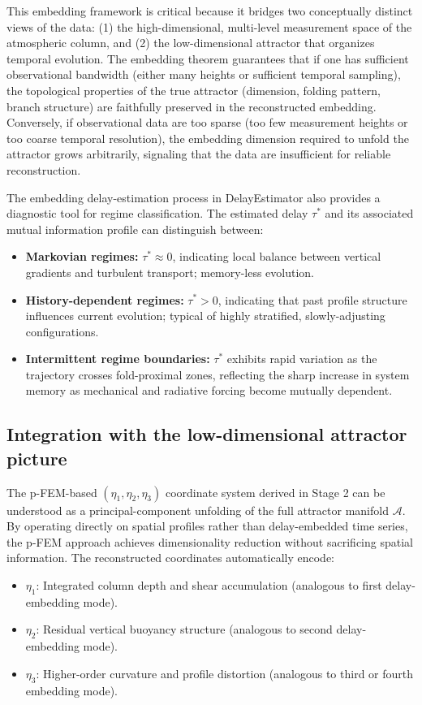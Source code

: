 \documentclass[12pt,a4paper]{article}
\begin{document}
This embedding framework is critical because it bridges two conceptually distinct views of the data: (1) the high-dimensional, multi-level measurement space of the atmospheric column, and (2) the low-dimensional attractor that organizes temporal evolution. The embedding theorem guarantees that if one has sufficient observational bandwidth (either many heights or sufficient temporal sampling), the topological properties of the true attractor (dimension, folding pattern, branch structure) are faithfully preserved in the reconstructed embedding. Conversely, if observational data are too sparse (too few measurement heights or too coarse temporal resolution), the embedding dimension required to unfold the attractor grows arbitrarily, signaling that the data are insufficient for reliable reconstruction.

The embedding delay-estimation process in DelayEstimator also provides a diagnostic tool for regime classification. The estimated delay $\tau^*$ and its associated mutual information profile can distinguish between:
\begin{itemize}
  \item \textbf{Markovian regimes:} $\tau^* \approx 0$, indicating local balance between vertical gradients and turbulent transport; memory-less evolution.
  \item \textbf{History-dependent regimes:} $\tau^* > 0$, indicating that past profile structure influences current evolution; typical of highly stratified, slowly-adjusting configurations.
  \item \textbf{Intermittent regime boundaries:} $\tau^*$ exhibits rapid variation as the trajectory crosses fold-proximal zones, reflecting the sharp increase in system memory as mechanical and radiative forcing become mutually dependent.
\end{itemize}

\subsection{Integration with the low-dimensional attractor picture}

The p-FEM-based $(\eta_1, \eta_2, \eta_3)$ coordinate system derived in Stage 2 can be understood as a principal-component unfolding of the full attractor manifold $\mathcal{A}$. By operating directly on spatial profiles rather than delay-embedded time series, the p-FEM approach achieves dimensionality reduction without sacrificing spatial information. The reconstructed coordinates automatically encode:
\begin{itemize}
  \item $\eta_1$: Integrated column depth and shear accumulation (analogous to first delay-embedding mode).
  \item $\eta_2$: Residual vertical buoyancy structure (analogous to second delay-embedding mode).
  \item $\eta_3$: Higher-order curvature and profile distortion (analogous to third or fourth embedding mode).
\end{itemize}
\end{document}
